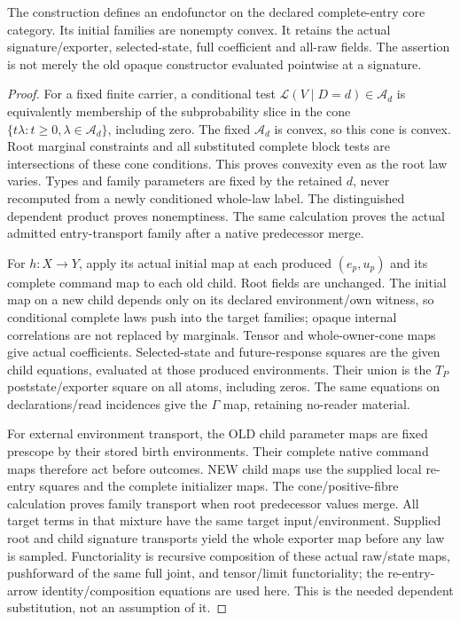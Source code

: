 \documentclass[11pt]{article}
\begin{document}
\begin{lemma}
The construction defines an endofunctor on the declared complete-entry core category. Its initial families are nonempty convex. It retains the actual signature/exporter, selected-state, full coefficient and all-raw fields. The assertion is not merely the old opaque constructor evaluated pointwise at a signature.
\end{lemma}
\begin{proof}
For a fixed finite carrier, a conditional test $\mathcal L(V\mid D=d)\in\mathcal A_d$ is equivalently membership of the subprobability slice in the cone $\{t\lambda:t\geq0,\lambda\in\mathcal A_d\}$, including zero. The fixed $\mathcal A_d$ is convex, so this cone is convex. Root marginal constraints and all substituted complete block tests are intersections of these cone conditions. This proves convexity even as the root law varies. Types and family parameters are fixed by the retained $d$, never recomputed from a newly conditioned whole-law label. The distinguished dependent product proves nonemptiness. The same calculation proves the actual admitted entry-transport family after a native predecessor merge.

For $h:X\to Y$, apply its actual initial map at each produced $(e_p,u_p)$ and its complete command map to each old child. Root fields are unchanged. The initial map on a new child depends only on its declared environment/own witness, so conditional complete laws push into the target families; opaque internal correlations are not replaced by marginals. Tensor and whole-owner-cone maps give actual coefficients. Selected-state and future-response squares are the given child equations, evaluated at those produced environments. Their union is the $T_P$ poststate/exporter square on all atoms, including zeros. The same equations on declarations/read incidences give the $\Gamma$ map, retaining no-reader material.

For external environment transport, the OLD child parameter maps are fixed prescope by their stored birth environments. Their complete native command maps therefore act before outcomes. NEW child maps use the supplied local re-entry squares and the complete initializer maps. The cone/positive-fibre calculation proves family transport when root predecessor values merge. All target terms in that mixture have the same target input/environment. Supplied root and child signature transports yield the whole exporter map before any law is sampled. Functoriality is recursive composition of these actual raw/state maps, pushforward of the same full joint, and tensor/limit functoriality; the re-entry-arrow identity/composition equations are used here. This is the needed dependent substitution, not an assumption of it.


\end{proof}
\end{document}
